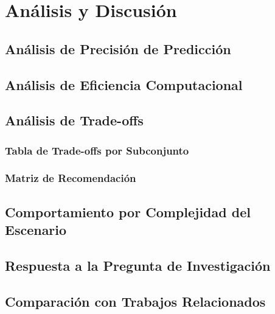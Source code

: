
\chapter{Análisis y Discusión}

\section{Análisis de Precisión de Predicción}

\section{Análisis de Eficiencia Computacional}

\section{Análisis de Trade-offs}
\subsection{Tabla de Trade-offs por Subconjunto}
\subsection{Matriz de Recomendación}

\section{Comportamiento por Complejidad del Escenario}

\section{Respuesta a la Pregunta de Investigación}

\section{Comparación con Trabajos Relacionados}
